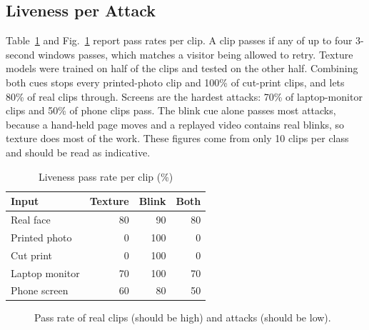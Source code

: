 \documentclass[conference,a4paper]{IEEEtran}
\begin{document}
\subsection{Liveness per Attack}
Table~\ref{tab:live} and Fig.~\ref{fig:live} report pass rates per clip. A clip passes if any of up to four 3-second windows passes, which matches a visitor being allowed to retry. Texture models were trained on half of the clips and tested on the other half. Combining both cues stops every printed-photo clip and 100\% of cut-print clips, and lets 80\% of real clips through. Screens are the hardest attacks: 70\% of laptop-monitor clips and 50\% of phone clips pass. The blink cue alone passes most attacks, because a hand-held page moves and a replayed video contains real blinks, so texture does most of the work. These figures come from only 10 clips per class and should be read as indicative.

\begin{table}[t]
\caption{Liveness pass rate per clip (\%)}
\label{tab:live}
\centering\footnotesize
\begin{tabular}{@{}lrrr@{}}
\toprule
Input & Texture & Blink & Both \\
\midrule
Real face & 80 & 90 & 80 \\
Printed photo & 0 & 100 & 0 \\
Cut print & 0 & 100 & 0 \\
Laptop monitor & 70 & 100 & 70 \\
Phone screen & 60 & 80 & 50 \\
\bottomrule
\end{tabular}
\end{table}

\begin{figure}[t]
\centering
{}
\caption{Pass rate of real clips (should be high) and attacks (should be low).}
\label{fig:live}
\end{figure}
\end{document}
